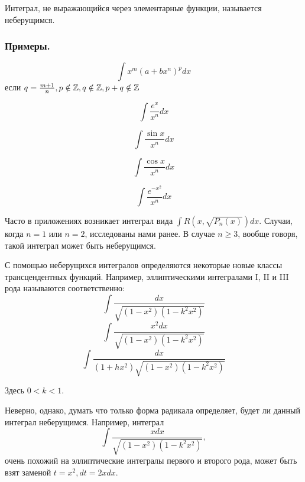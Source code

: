 \opred

Интеграл, не выражающийся через элементарные функции, называется неберущимся.

\subsubsection{Примеры.}
$$\int x^m(a+bx^n)^p dx$$
если $q=\frac{m+1}{n}, p \notin \mathbb{Z}, q \notin\mathbb{Z}, p+q\notin \mathbb{Z}$

$$\int \frac{e^x}{x^n}dx$$

$$\int \frac{\sin x}{x^n}dx$$

$$\int \frac{\cos x}{x^n}dx$$

$$\int \frac{e^{-x^2}}{x^n}dx$$

Часто в приложениях возникает интеграл вида $\int R(x,\sqrt{P_n(x)})dx$. Случаи, когда $n=1$ или $n=2$, исследованы нами ранее. В случае $n \geq 3$, вообще говоря, такой интеграл может быть неберущимся.

С помощью неберущихся интегралов определяются некоторые новые классы трансцендентных функций. Например, эллиптическими интегралами I, II и III рода называются соответственно:
$$\int \frac{dx}{\sqrt{(1-x^2)(1-k^2 x^2)}}$$
$$\int \frac{x^2 dx}{\sqrt{(1-x^2)(1-k^2 x^2)}}$$
$$\int \frac{dx}{(1+hx^2)\sqrt{(1-x^2)(1-k^2 x^2)}}$$

Здесь $0<k<1$.

Неверно, однако, думать что только форма радикала определяет, будет ли данный интеграл неберущимся. Например, интеграл 
$$\int \frac{xdx}{\sqrt{(1-x^2)(1-k^2 x^2)}},$$
очень похожий на эллиптические интегралы первого и второго рода, может быть взят заменой $t=x^2, dt=2xdx$.

